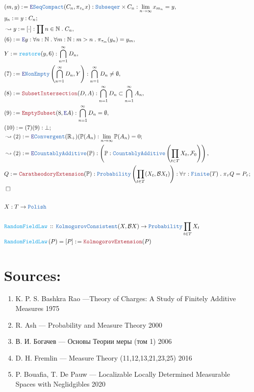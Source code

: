 \documentclass[12pt]{scrartcl}
\newcommand{\TYPE}[1]{\textcolor{NavyBlue}{\mathtt{#1}}}
\newcommand{\FUNC}[1]{\textcolor{Cerulean}{\mathtt{#1}}}
\newcommand{\LOGIC}[1]{\textcolor{Blue}{\mathtt{#1}}}
\newcommand{\THM}[1]{\textcolor{Maroon}{\mathtt{#1}}}
\renewcommand{\.}{\; . \;}
\newcommand{\de}{: \kern 0.1pc =}
\newcommand{\Act}[1]{\left( #1 \right)}
\newcommand{\DeclareFunc}[2]{& \FUNC{#1} \, :: \, #2 \\}
\newcommand{\DefineNamedFunc}[4]{&  \FUNC{#1}\Act{#2} = #3 \de #4 \\}
\newcommand{\Page}[1]{ \begin{align*} #1 \end{align*}   }
\newcommand{\Reals}{\mathbb{R} }
\newcommand{\Nat}{\mathbb{N} }
\newcommand{\Say}[3]{& #1 \de #2 : #3, \\}
\newcommand{\Conclude}[3]{& #1 \de #2 : #3; \\}
\newcommand{\Derive}[3]{& \leadsto #1 \de #2 : #3, \\}
\newcommand{\DeriveConclude}[3]{& \leadsto #1 \de #2 : #3 ; \\}
\newcommand{\ByDef}{\LOGIC{E}}
\newcommand{\QED}{\; \square}
\newcommand{\EndProof}{& \QED \\}
\newcommand{\B}{\mathcal{B}}
\newcommand{\F}{\mathcal{F}}
\begin{document}
\newpage
\Page{
\Say{(m,y)}{ \ByDef\TYPE{SeqCompact}(C_n, \pi_{\tau_n} x )   }{ \TYPE{Subseqer} \times C_n : \lim_{n \to \infty} x_{m_n} = y }
\Conclude{y_n}{y}{C_n}
\Derive{y}{[\cdot]}{\prod n \in \Nat \. C_n}
\Say{(6)}{\ByDef y  }{  \forall n : \Nat \. \forall m : \Nat : m > n \. \pi_{\tau_m}(y_n) = y_m  }
\Say{ Y }{\FUNC{restore}(y,6)}{ \bigcap^\infty_{n =1 } D_n  }
\Say{ (7) }{ \ByDef\TYPE{NonEmpty}\left( \bigcap^\infty_{n = 1} D_n, Y \right)    }{ \bigcap^\infty_{n = 1} D_n \neq \emptyset }
\Say{ (8) }{ \THM{SubsetIntersection}(D,A)}{ \bigcap^\infty_{n = 1} D_n \subset \bigcap^\infty_{n = 1} A_n   }
\Say{(9)}{ \THM{EmptySubset}(8, \ByDef A) }{ \bigcap^\infty_{n = 1} D_n = \emptyset }
\Conclude{(10)}{(7)(9)}{ \bot }
\DeriveConclude{ (2)  }{ \ByDef\TYPE{Convergent}(\Reals_+)( \mathbb{P}(A_n )}{ \lim_{n \to \infty} \mathbb{P}(A_n) = 0 }
\Derive{ (2) }{ \ByDef\TYPE{CountablyAdditive}(\mathbb{P}) }{ \left( \mathbb{P} : \TYPE{CountablyAdditive}\left( \prod_{t \in T} X_t, \F_0 \right) \right) }
\Conclude{ Q  }{\THM{CaratheodoryExtension}(\mathbb{P}) }{ \TYPE{Probability} \left( \prod_{t \in T} (X_t, \B X_t) \right)
: \forall \tau : \TYPE{Finite}(T) \. \pi_{\tau} Q = P_\tau
}
\EndProof
\\
& X : T \to \TYPE{Polish} \\
\\
\DeclareFunc{ RandomFieldLaw  }{ \TYPE{KolmogorovConsistent}(X, \B X) \to  \TYPE{Probability} \prod_{t \in T} X_t  }
\DefineNamedFunc{ RandomFieldLaw  }{ P }{[P]}{ \THM{ KolmogorovExtension  }(P) }
}
\newpage
\section*{Sources:}
\begin{enumerate}
\item K. P. S. Bashkra Rao ---Theory of Charges: A Study of Finitely Additive Measures 1975
\item  R. Ash     --- Probability and Measure Theory 2000
\item  В. И. Богачев --- Основы Теории меры (том 1) 2006 
\item  D. H. Fremlin --- Measure Theory (11,12,13,21,23,25) 2016
\item P. Bouafia, T. De Pauw ---  Localizable Locally Determined Measurable Spaces with Neglidgibles 2020
\end{enumerate}
\end{document}
